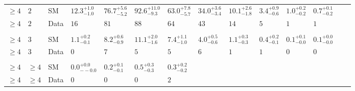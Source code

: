 \begin{landscape}
\begin{center}
\begin{table}[h!]
\begin{tabular}{ llllllllllllll }
    $\geq 4$             & $2$      & SM   & $12.3^{+1.0}_{-1.0}$           & $76.7^{+5.6}_{-5.2}$           & $92.6^{+11.0}_{-9.3}$          & $63.0^{+7.8}_{-5.7}$           & $34.0^{+3.6}_{-3.4}$           & $10.1^{+2.6}_{-1.8}$           & $3.4^{+0.9}_{-0.6}$            & $1.0^{+0.2}_{-0.2}$            & $0.7^{+0.1}_{-0.2}$                      \\ 
    $\geq 4$             & $2$      & Data & $16$                           & $81$                           & $88$                           & $64$                           & $43$                           & $14$                           & $5$                            & $1$                            & $1$                      \\\\ 
    $\geq 4$             & $3$      & SM   & $1.1^{+0.2}_{-0.1}$            & $8.2^{+0.6}_{-0.9}$            & $11.1^{+2.0}_{-1.6}$           & $7.4^{+1.1}_{-1.0}$            & $4.0^{+0.5}_{-0.6}$            & $1.1^{+0.3}_{-0.3}$            & $0.4^{+0.2}_{-0.1}$            & $0.1^{+0.1}_{-0.0}$            & $0.1^{+0.0}_{-0.0}$                     \\ 
    $\geq 4$             & $3$      & Data & $0$                            & $7$                            & $5$                            & $5$                            & $6$                            & $1$                            & $1$                            & $0$                            & $0$                      \\\\ 
    $\geq 4$             & $\geq 4$ & SM   & $0.0^{+0.0}_{--0.0}$           & $0.2^{+0.1}_{-0.1}$            & $0.5^{+0.3}_{-0.3}$            & $0.3^{+0.2}_{-0.2}$  & \multicolumn{7}{l}{}                                                                                                                                          \\ 
    $\geq 4$             & $\geq 4$ & Data & $0$                            & $0$                            & $0$                            & $2$                  & \multicolumn{7}{l}{}                                                                                                                                         \\
    \hline
    \hline
  \end{tabular}
\end{table}
\end{center}
\end{landscape}


